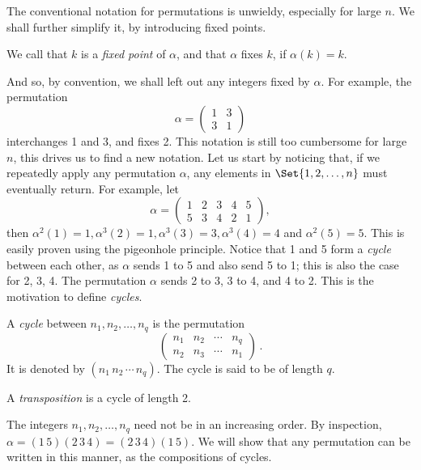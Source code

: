 \documentclass[main.tex]{subfiles}
\begin{document}
				The conventional notation for permutations is unwieldy, especially for large $n$. We shall further simplify it, by introducing fixed points.
				\begin{definition}
					We call that $k$ is a \textit{fixed point}  of $\alpha$, and that $\alpha$ fixes $k$, if $\alpha(k) = k$.
				\end{definition}
				And so, by convention, we shall left out any integers fixed by $\alpha$. For example, the permutation
				\begin{equation*}
				\alpha = \begin{pmatrix}
				1 & 3 \\
				3 & 1
				\end{pmatrix}
				\end{equation*}
				interchanges 1 and 3, and fixes 2. This notation is still too cumbersome for large $n$, this drives us to find a new notation. Let us start by noticing that, if we repeatedly apply any permutation $\alpha$, any elements in $\Set{1, 2, \ldots, n}$ must eventually return. For example, let
				\begin{equation*}
				\alpha = \begin{pmatrix}
				1 & 2 & 3 & 4 & 5\\
				5 & 3 & 4 & 2 & 1
				\end{pmatrix},
				\end{equation*}
				then $\alpha^2(1) = 1, \alpha^3(2) = 1, \alpha^3(3) = 3, \alpha^3(4) = 4$ and $\alpha^2(5) = 5$. This is easily proven using the pigeonhole principle. Notice that 1 and 5 form a \textit{cycle} between each other, as $\alpha$ sends 1 to 5 and also send 5 to 1; this is also the case for 2, 3, 4. The permutation $\alpha$ sends 2 to 3, 3 to 4, and 4 to 2. This is the motivation to define \textit{cycles}.
				\begin{definition}
					A \textit{cycle} between $n_1, n_2, \ldots, n_q$ is the permutation
					\begin{equation*}
					\begin{pmatrix}
					n_1 & n_2 & \cdots & n_q \\
					n_2 & n_3 & \cdots & n_1
					\end{pmatrix}\,.
					\end{equation*}
					It is denoted by $(n_1\,n_2\,\cdots\,n_q)$. The cycle is said to be of length $q$.
				\end{definition}
				\begin{definition}
					A \textit{transposition} is a cycle of length 2.
				\end{definition}
				The integers $n_1, n_2, \ldots, n_q$ need not be in an increasing order. By inspection, $\alpha = (1\,5)(2\, 3\,4) = (2\,3\,4)(1\,5)$. We will show that any permutation can be written in this manner, as the compositions of cycles.
				
\end{document}
